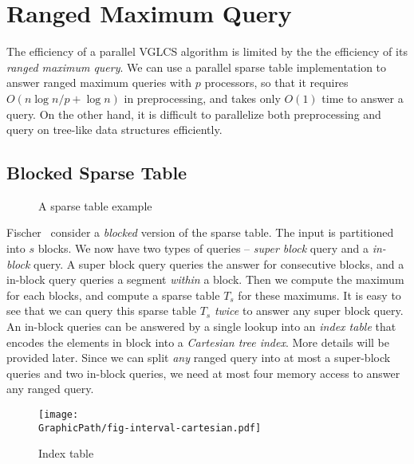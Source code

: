 \section{Ranged Maximum Query} \label{sec:parallelRMQ}


The efficiency of a parallel VGLCS algorithm is limited by the the
efficiency of its {\em ranged maximum query}.  We can use a parallel
sparse table implementation to answer ranged maximum queries with $p$
processors, so that it requires $O(n \log n / p + \log n)$ in
preprocessing, and takes only $O(1)$ time to answer a query.  On the
other hand, it is difficult to parallelize both preprocessing and
query on tree-like data structures efficiently.

\subsection{Blocked Sparse Table}

\begin{figure}[!thb]
  \centering {} 
  \caption{A sparse table example}
  \label{fig:interval-decomposition}
\end{figure}


Fischer~\cite{Fischer2006TheoreticalAP} consider a {\em blocked}
version of the sparse table.  The input is partitioned into $s$ blocks.
We now have two types of queries -- {\em super block} query and a {\em
  in-block} query.  A super block query queries the answer for
consecutive blocks, and a in-block query queries a segment {\em
  within} a block.  Then we compute the maximum for each blocks, and
compute a sparse table $T_s$ for these maximums.  It is easy to see
that we can query this sparse table $T_s$ {\em twice} to answer any
super block query.  An in-block queries can be answered by a single
lookup into an {\em index table} that encodes the elements in block
into a {\em Cartesian tree index}.  More details will be provided
later.  Since we can split {\em any} ranged query into at most a
super-block queries and two in-block queries, we need at most four
memory access to answer any ranged query.

\begin{figure}[!thb]
  \centering
  \texttt{[image: \\GraphicPath/fig-interval-cartesian.pdf]}
  \caption{Index table}
  \label{fig:interval-cartesian}
\end{figure}

